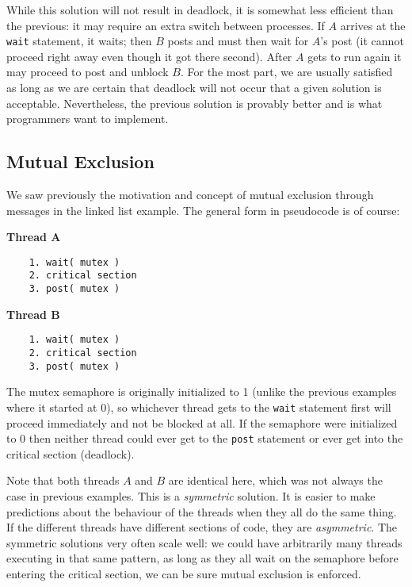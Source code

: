 While this solution will not result in deadlock, it is somewhat less efficient than the previous: it may require an extra switch between processes. If $A$ arrives at the \texttt{wait} statement, it waits; then $B$ posts and must then wait for $A$'s post (it cannot proceed right away even though it got there second). After $A$ gets to run again it may proceed to post and unblock $B$. For the most part, we are usually satisfied as long as we are certain that deadlock will not occur that a given solution is acceptable. Nevertheless, the previous solution is provably better and is what programmers want to implement.

\subsection*{Mutual Exclusion}
We saw previously the motivation and concept of mutual exclusion through messages in the linked list example. The general form in pseudocode is of course:

\begin{multicols}{2}
	\textbf{Thread A}\vspace{-2em}
	\begin{verbatim}
	1. wait( mutex )
	2. critical section
	3. post( mutex )
  \end{verbatim}
	\columnbreak
	\textbf{Thread B}\vspace{-2em}
	\begin{verbatim}
	1. wait( mutex )
	2. critical section
	3. post( mutex )
  \end{verbatim}
\end{multicols}
\vspace{-2em}

The mutex semaphore is originally initialized to 1 (unlike the previous examples where it started at 0), so whichever thread gets to the \texttt{wait} statement first will proceed immediately and not be blocked at all. If the semaphore were initialized to 0 then neither thread could ever get to the \texttt{post} statement or ever get into the critical section (deadlock).

Note that both threads $A$ and $B$ are identical here, which was not always the case in previous examples. This is a \textit{symmetric} solution. It is easier to make predictions about the behaviour of the threads when they all do the same thing. If the different threads have different sections of code, they are \textit{asymmetric}. The symmetric solutions very often scale well: we could have arbitrarily many threads executing in that same pattern, as long as they all wait on the semaphore before entering the critical section, we can be sure mutual exclusion is enforced.

